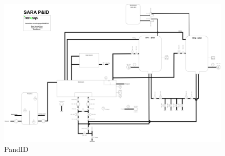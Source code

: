 \begin{figure}[htbp]
    \centering
    \includegraphics[angle=90,width=1\textwidth]{Figurar/P&ID.drawio.png}
    \caption{PandID}\label{fig:HMI}
\end{figure}